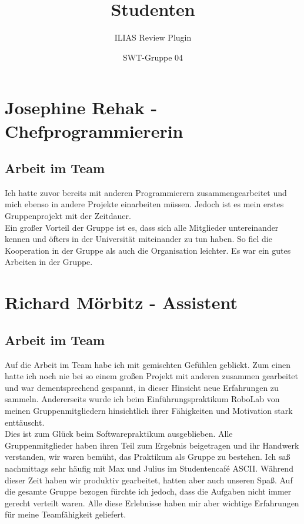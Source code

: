 \documentclass[a4paper]{scrreprt}
\begin{document}
 
\title{Studenten}
\subtitle{ILIAS Review Plugin}
\author{SWT-Gruppe 04}
\maketitle

\tableofcontents

\chapter{Josephine Rehak - Chefprogrammiererin}
\section{Arbeit im Team}
Ich hatte zuvor bereits mit anderen Programmierern zusammengearbeitet und mich ebenso in andere Projekte einarbeiten müssen. Jedoch ist es mein erstes Gruppenprojekt mit der Zeitdauer. \\
Ein großer Vorteil der Gruppe ist es, dass sich alle Mitglieder untereinander kennen und öfters in der Universität miteinander zu tun haben. So fiel die Kooperation in der Gruppe als auch die Organisation leichter. Es war ein gutes Arbeiten in der Gruppe.

\chapter{Richard Mörbitz - Assistent}
\section{Arbeit im Team}
Auf die Arbeit im Team habe ich mit gemischten Gefühlen geblickt. Zum einen hatte ich noch nie bei so einem großen Projekt mit anderen zusammen gearbeitet und war dementsprechend gespannt, in dieser Hinsicht neue Erfahrungen zu sammeln. Andererseits wurde ich beim Einführungspraktikum RoboLab von meinen Gruppenmitgliedern hinsichtlich ihrer Fähigkeiten und Motivation stark enttäuscht.\\
Dies ist zum Glück beim Softwarepraktikum ausgeblieben. Alle Gruppenmitglieder haben ihren Teil zum Ergebnis beigetragen und ihr Handwerk verstanden, wir waren bemüht, das Praktikum als Gruppe zu bestehen. Ich saß nachmittags sehr häufig mit Max und Julius im Studentencafé ASCII. Während dieser Zeit haben wir produktiv gearbeitet, hatten aber auch unseren Spaß. Auf die gesamte Gruppe bezogen fürchte ich jedoch, dass die Aufgaben nicht immer gerecht verteilt waren. Alle diese Erlebnisse haben mir aber wichtige Erfahrungen für meine Teamfähigkeit geliefert.
\end{document}
